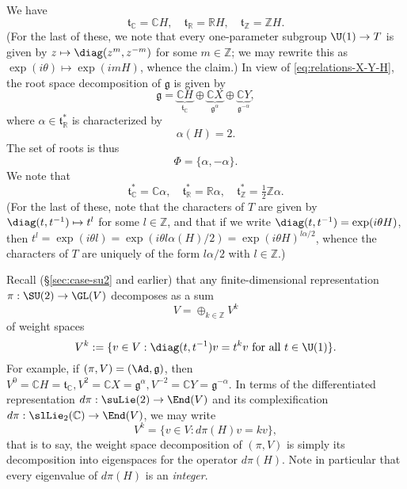\documentclass[reqno]{amsart} 
\begin{document}
We have
\begin{equation*}
  \mathfrak{t}_{\mathbb{C}} = \mathbb{C} H, \quad \mathfrak{t}_{\mathbb{R}} = \mathbb{R} H, \quad \mathfrak{t}_{\mathbb{Z}} = \mathbb{Z} H.
\end{equation*}
(For the last of these, we note that every one-parameter subgroup $\U(1) \rightarrow T$ is given by $z \mapsto \diag(z^m, z^{-m})$ for some $m \in \mathbb{Z}$; we may rewrite this as $\exp(i \theta) \mapsto \exp(i m H)$, whence the claim.)  In view of \eqref{eq:relations-X-Y-H}, the root space decomposition of $\mathfrak{g}$ is given by
\begin{equation*}
  \mathfrak{g} =
  \underbrace{\mathbb{C} H}_{\mathfrak{t}_{\mathbb{C}}}
  \oplus
  \underbrace{\mathbb{C} X}_{\mathfrak{g}^{\alpha}}
  \oplus
  \underbrace{\mathbb{C} Y}_{\mathfrak{g}^{-\alpha}},
\end{equation*}
where $\alpha \in \mathfrak{t} _{\mathbb{R} }^*$ is characterized by
\begin{equation*}
  \alpha(H) = 2.
\end{equation*}
The set of roots is thus
\begin{equation*}
  \Phi = \{\alpha, - \alpha\}.
\end{equation*}
We note that
\begin{equation*}
  \mathfrak{t}_{\mathbb{C}}^* = \mathbb{C} \alpha,
  \quad
  \mathfrak{t}_{\mathbb{R}}^* = \mathbb{R} \alpha,
  \quad
  \mathfrak{t}_{\mathbb{Z}}^*
  =  \tfrac{1}{2}\mathbb{Z} \alpha.
\end{equation*}
(For the last of these, note that the characters of $T$ are given by $\diag(t,t^{-1}) \mapsto t^{l}$ for some $l \in \mathbb{Z}$, and that if we write $\diag(t,t^{-1}) = \exp(i \theta H)$, then $t^l = \exp(i \theta l) = \exp(i \theta l \alpha(H)/2) = \exp(i \theta H)^{l \alpha/2}$, whence the characters of $T$ are uniquely of the form $l \alpha/2$ with $l \in \mathbb{Z}$.)

Recall (\S\ref{sec:case-su2} and earlier) that any finite-dimensional representation $\pi : \SU(2) \rightarrow \GL(V)$ decomposes as a sum
\begin{equation*}
  V = \oplus_{k \in \mathbb{Z}} V^k
\end{equation*}
of weight spaces
\begin{equation*}
  V^k := \{v \in V : \diag(t,t^{-1}) v = t^k v \text{ for all } t \in \U(1) \}.
\end{equation*}
For example, if $(\pi,V) = (\Ad,\mathfrak{g})$, then $V^0 = \mathbb{C} H = \mathfrak{t}_{\mathbb{C}}, V^2 = \mathbb{C} X = \mathfrak{g}^{\alpha}, V^{-2} = \mathbb{C} Y = \mathfrak{g}^{-\alpha}$.  In terms of the differentiated representation $d \pi : \suLie(2) \rightarrow \End(V)$ and its complexification $d \pi : \slLie_2(\mathbb{C}) \rightarrow \End(V)$, we may write
\begin{equation*}
  V^k = \{v \in V : d \pi(H) v = k v \},
\end{equation*}
that is to say, the weight space decomposition of $(\pi,V)$ is simply its decomposition into eigenspaces for the operator $d \pi(H)$.  Note in particular that every eigenvalue of $d \pi(H)$ is an \emph{integer}.
\end{document}
